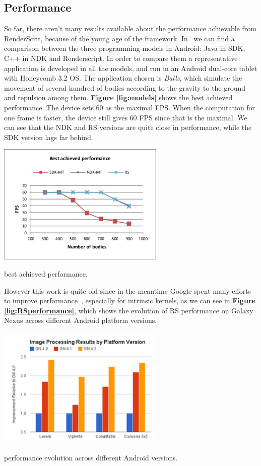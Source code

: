 \documentclass[a4paper,10pt]{article}
\makeatletter
\newenvironment{figurehere}{\def\@captype{figure}\vspace{2ex}}{\vspace{2ex}}
\makeatother
\begin{document}
\begin{multicols}{2}
\section{Performance}
So far, there aren't many results available about the performance achievable from RenderScrit, because of the young age of the framework.
In~\cite{qian2012comparison} we can find a comparison between the three programming models in Android: Java in SDK, C++ in NDK and Renderscript. 
In order to compare them a representative application is developed in all the models, and run in an Android dual-core tablet with Honeycomb 3.2 OS.
The application chosen is \emph{Balls}, which simulate the movement of several hundred of bodies according to the gravity to the ground and repulsion among them.
{\bf Figure \ref{fig:models}} shows the best achieved performance. The device sets 60 as the maximal FPS. When the computation for one frame is faster, the device still gives 60 FPS since that is the maximal. We can see that the NDK and RS versions are quite close in performance, while the SDK version lags far behind.

\begin{figurehere}
 \centering
 \includegraphics[width=8cm]{./pictures/models}
 \caption{best achieved performance.}
 \label{fig:models}
\end{figurehere}

However this work is quite old since in the meantime Google spent many efforts to improve performance~\cite{Rsperf:2013:Online}, especially for intrinsic kernels, as we can see in {\bf Figure \ref{fig:RSperformance}}, which shows the evolution of RS performance on Galaxy Nexus across different Android platform versions.

\begin{figurehere}
 \centering
 \includegraphics[width=8cm]{./pictures/perform}
 \caption{performance evolution across different Android versions.}
 \label{fig:RSperformance}
\end{figurehere}


\end{multicols}
\end{document}
